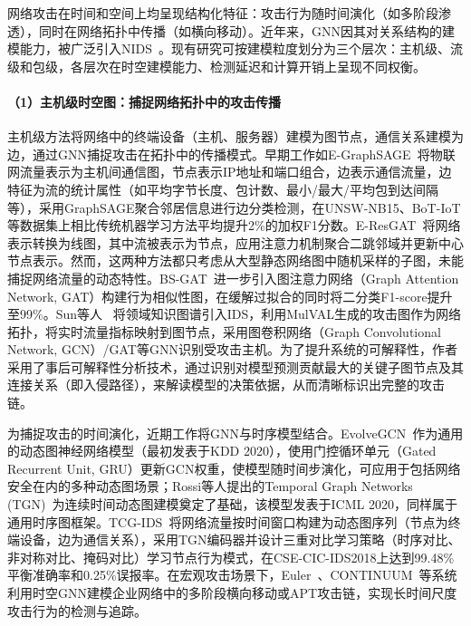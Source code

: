 网络攻击在时间和空间上均呈现结构化特征：攻击行为随时间演化（如多阶段渗透），同时在网络拓扑中传播（如横向移动）。近年来，GNN因其对关系结构的建模能力，被广泛引入NIDS~\cite{lo2022egraphsage,E-ResGAT,wang2025bsgat}。现有研究可按建模粒度划分为三个层次：主机级、流级和包级，各层次在时空建模能力、检测延迟和计算开销上呈现不同权衡。

\paragraph{（1）主机级时空图：捕捉网络拓扑中的攻击传播}


主机级方法将网络中的终端设备（主机、服务器）建模为图节点，通信关系建模为边，通过GNN捕捉攻击在拓扑中的传播模式。早期工作如E-GraphSAGE~\cite{lo2022egraphsage}将物联网流量表示为主机间通信图，节点表示IP地址和端口组合，边表示通信流量，边特征为流的统计属性（如平均字节长度、包计数、最小/最大/平均包到达间隔等），采用GraphSAGE聚合邻居信息进行边分类检测，在UNSW-NB15、BoT-IoT等数据集上相比传统机器学习方法平均提升2\%的加权F1分数。E-ResGAT~\cite{E-ResGAT}将网络表示转换为线图，其中流被表示为节点，应用注意力机制聚合二跳邻域并更新中心节点表示。然而，这两种方法都只考虑从大型静态网络图中随机采样的子图，未能捕捉网络流量的动态特性。BS-GAT~\cite{wang2025bsgat}进一步引入图注意力网络（Graph Attention Network, GAT）构建行为相似性图，在缓解过拟合的同时将二分类F1-score提升至99\%。Sun等人~\cite{sun2024gnnids} 将领域知识图谱引入IDS，利用MulVAL生成的攻击图作为网络拓扑，将实时流量指标映射到图节点，采用图卷积网络（Graph Convolutional Network, GCN）/GAT等GNN识别受攻击主机。为了提升系统的可解释性，作者采用了事后可解释性分析技术，通过识别对模型预测贡献最大的关键子图节点及其连接关系（即入侵路径），来解读模型的决策依据，从而清晰标识出完整的攻击链。

为捕捉攻击的时间演化，近期工作将GNN与时序模型结合。EvolveGCN~\cite{EvolveGCN}作为通用的动态图神经网络模型（最初发表于KDD 2020），使用门控循环单元（Gated Recurrent Unit, GRU）更新GCN权重，使模型随时间步演化，可应用于包括网络安全在内的多种动态图场景；Rossi等人提出的Temporal Graph Networks (TGN)~\cite{TGN}为连续时间动态图建模奠定了基础，该模型发表于ICML 2020，同样属于通用时序图框架。TCG-IDS~\cite{TCG-IDS}将网络流量按时间窗口构建为动态图序列（节点为终端设备，边为通信关系），采用TGN编码器并设计三重对比学习策略（时序对比、非对称对比、掩码对比）学习节点行为模式，在CSE-CIC-IDS2018上达到99.48\%平衡准确率和0.25\%误报率。在宏观攻击场景下，Euler~\cite{king2023euler}、CONTINUUM~\cite{bahar2025continuum}等系统利用时空GNN建模企业网络中的多阶段横向移动或APT攻击链，实现长时间尺度攻击行为的检测与追踪。

